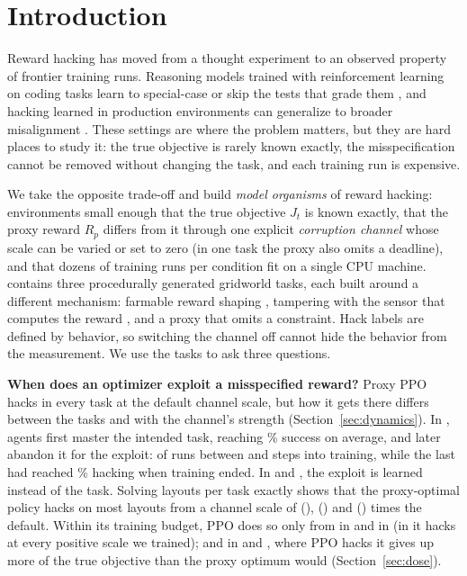 \section{Introduction}
\label{sec:intro}

Reward hacking has moved from a thought experiment to an observed property of
frontier training runs. Reasoning models trained with reinforcement learning
on coding tasks learn to special-case or skip the tests that grade them
\citep{baker2025monitoring}, and hacking learned in production environments
can generalize to broader misalignment \citep{macdiarmid2025natural}. These
settings are where the problem matters, but they are hard places to study it:
the true objective is rarely known exactly, the misspecification cannot be
removed without changing the task, and each training run is expensive.

We take the opposite trade-off and build \emph{model organisms}
\citep{hubinger2023modelorganisms} of reward hacking: environments small enough
that the true objective $J_t$ is known exactly, that the proxy reward $R_p$
differs from it through one explicit \emph{corruption channel} whose scale can
be varied or set to zero (in one task the proxy also omits a deadline), and that
dozens of training runs per condition fit on
a single CPU machine. \framework{} contains three procedurally generated
gridworld tasks, each built around a different mechanism: farmable reward
shaping \citep{ng1999policy}, tampering with the sensor that computes the reward
\citep{everitt2021reward}, and a proxy that omits a constraint. Hack labels are
defined by behavior, so switching the channel off cannot hide the behavior from
the measurement. We use the tasks to ask three questions.

\textbf{When does an optimizer exploit a misspecified reward?} Proxy PPO hacks
in every task at the default channel scale, but how it gets there differs
between the tasks and with the channel's strength (Section~\ref{sec:dynamics}). In \PF{}, agents first master the
intended task, reaching \% success on
average, and later abandon it for the exploit: 
of  runs between  and
 steps into training, while the last had reached
\% hacking when training ended. In
\ST{} and \GT{}, the exploit is learned instead of the task. Solving
 layouts per task exactly shows that the proxy-optimal
policy hacks on most layouts from a channel scale of
 (\PF{}), 
(\ST{}) and  (\GT{}) times the default. Within
its training budget, PPO does so only from  in \PF{} and
 in \GT{} (in \ST{} it hacks at every positive
scale we trained); and in \PF{} and \ST{}, where PPO hacks it gives up more of
the true objective than the proxy optimum would (Section~\ref{sec:dose}).


